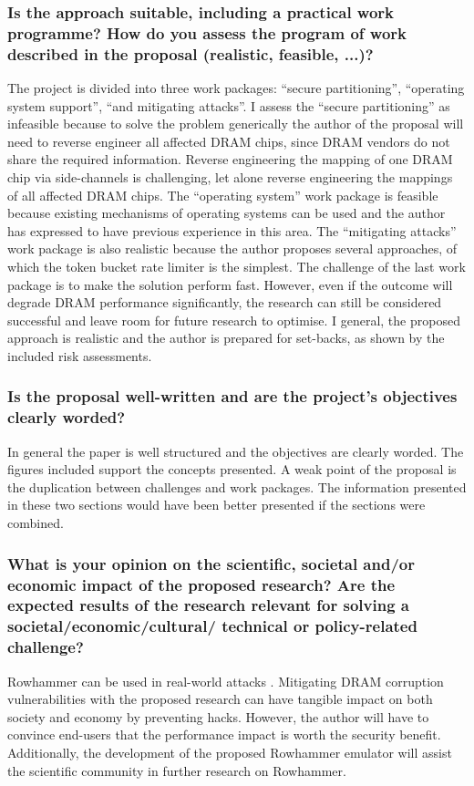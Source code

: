 \subsubsection*{Is the approach suitable, including a practical work programme? How do you assess the program of work described in the proposal (realistic, feasible, ...)?}
The project is divided into three work packages: ``secure partitioning'', ``operating system support'', ``and mitigating attacks''. I assess the ``secure partitioning'' as infeasible because to solve the problem generically the author of the proposal will need to reverse engineer all affected DRAM chips, since DRAM vendors do not share the required information. Reverse engineering the mapping of one DRAM chip via side-channels is challenging, let alone reverse engineering the mappings of all affected DRAM chips. The ``operating system'' work package is feasible because existing mechanisms of operating systems can be used and the author has expressed to have previous experience in this area. The ``mitigating attacks'' work package is also realistic because the author proposes several approaches, of which the token bucket rate limiter is the simplest. The challenge of the last work package is to make the solution perform fast. However, even if the outcome will degrade DRAM performance significantly, the research can still be considered successful and leave room for future research to optimise. I general, the proposed approach is realistic and the author is prepared for set-backs, as shown by the included risk assessments.

\subsubsection*{Is the proposal well-written and are the project’s objectives clearly worded?}
In general the paper is well structured and the objectives are clearly worded. The figures included support the concepts presented. A weak point of the proposal is the duplication between challenges and work packages. The information presented in these two sections would have been better presented if the sections were combined. %

\subsubsection*{What is your opinion on the scientific, societal and/or economic impact of the proposed research? Are the expected results of the research relevant for solving a societal/economic/cultural/ technical or policy-related challenge?}
Rowhammer can be used in real-world attacks \cite{van2016drammer}. Mitigating DRAM corruption vulnerabilities with the proposed research can have tangible impact on both society and economy by preventing hacks. However, the author will have to convince end-users that the performance impact is worth the security benefit. Additionally, the development of the proposed Rowhammer emulator will assist the scientific community in further research on Rowhammer.

